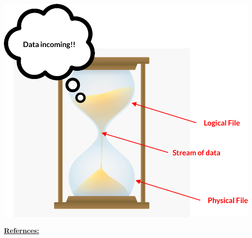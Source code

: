 \documentclass[12pt]{article}
\begin{document}
\begin{itemize}
\begin{itemize}
\begin{itemize}
            \begin{center}
            \includegraphics[width=0.8\linewidth]{images/week_8_notes_1_2.png}
            \end{center}
        \end{itemize}
    \end{itemize}

    \bigskip

    \underline{\textbf{Refernces:}}

    \bigskip


\end{itemize}
\end{document}
